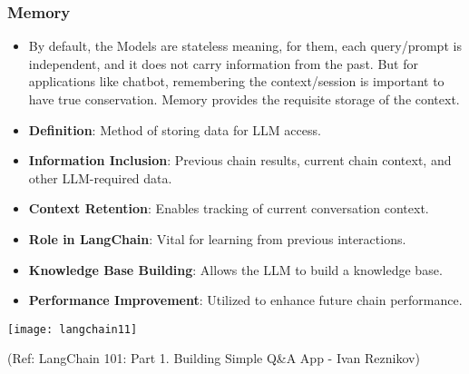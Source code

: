 \begin{frame}[fragile]\frametitle{Memory}

      \begin{itemize}
	  \item By default, the Models are stateless meaning, for them, each query/prompt is independent, and it does not carry information from the past. But for applications like chatbot, remembering the context/session is important to have true conservation. Memory provides the requisite storage of the context.
        \item \textbf{Definition}: Method of storing data for LLM access.
        \item \textbf{Information Inclusion}: Previous chain results, current chain context, and other LLM-required data.
        \item \textbf{Context Retention}: Enables tracking of current conversation context.
        \item \textbf{Role in LangChain}: Vital for learning from previous interactions.
        \item \textbf{Knowledge Base Building}: Allows the LLM to build a knowledge base.
        \item \textbf{Performance Improvement}: Utilized to enhance future chain performance.
      \end{itemize}
			\begin{center}
			\texttt{[image: langchain11]}
			\end{center}	  


			{\tiny (Ref: LangChain 101: Part 1. Building Simple Q\&A App - Ivan Reznikov)}
			
		

\end{frame}


